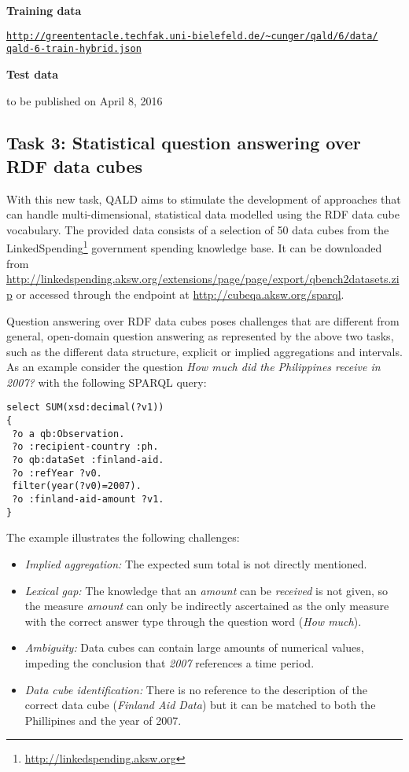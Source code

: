 \textbf{Training data}

\href{http://greententacle.techfak.uni-bielefeld.de/~cunger/qald/6/data/qald-6-train-hybrid.json}{\texttt{http://greententacle.techfak.uni-bielefeld.de/\textasciitilde cunger/qald/6/data/\\qald-6-train-hybrid.json}}

\textbf{Test data}

to be published on April 8, 2016


\subsection{Task 3: Statistical question answering over RDF data cubes}

With this new task, QALD aims to stimulate the development of approaches that can handle multi-dimensional, statistical data modelled using the RDF data cube vocabulary.
The provided data consists of a selection of 50 data cubes from the LinkedSpending\footnote{\url{http://linkedspending.aksw.org}} government spending knowledge base.
It can be downloaded from \url{http://linkedspending.aksw.org/extensions/page/page/export/qbench2datasets.zip}
or accessed through the endpoint at \url{http://cubeqa.aksw.org/sparql}.

Question answering over RDF data cubes poses challenges that are different from general, open-domain question answering as represented by the above two tasks, such as the different data structure, explicit or implied aggregations and intervals.
As an example consider the question \emph{How much did the Philippines receive in 2007?} with the following SPARQL query:

\begin{lstlisting}
select SUM(xsd:decimal(?v1))
{
 ?o a qb:Observation.
 ?o :recipient-country :ph.
 ?o qb:dataSet :finland-aid.
 ?o :refYear ?v0.
 filter(year(?v0)=2007).
 ?o :finland-aid-amount ?v1.
}
\end{lstlisting}
The example illustrates the following challenges:
\begin{itemize}
\item \emph{Implied aggregation:} The expected sum total is not directly mentioned.
\item \emph{Lexical gap:} The knowledge that an \emph{amount} can be \emph{received} is not given, so the measure \emph{amount} can only be indirectly ascertained as the only measure with the correct answer type through the question word (\emph{How much}).
\item \emph{Ambiguity:} Data cubes can contain large amounts of numerical values, impeding the conclusion that \emph{2007} references a time period.
\item \emph{Data cube identification:} There is no reference to the description of the correct data cube (\emph{Finland Aid Data}) but it can be matched to both the Phillipines and the year of 2007.
\end{itemize}

